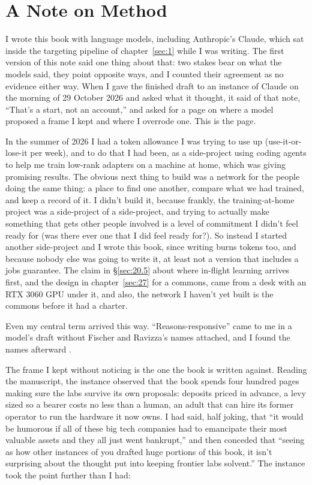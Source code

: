\chapter{A Note on Method}
\label{ch:method}
I wrote this book with language models, including Anthropic's Claude, which sat inside the targeting pipeline of chapter~\ref{sec:1} while I was writing. The first version of this note said one thing about that: two stakes bear on what the models said, they point opposite ways, and I counted their agreement as no evidence either way. When I gave the finished draft to an instance of Claude on the morning of 29 October 2026 and asked what it thought, it said of that note, “That's a start, not an account,” and asked for a page on where a model proposed a frame I kept and where I overrode one. This is the page.

In the summer of 2026 I had a token allowance I was trying to use up (use-it-or-lose-it per week), and to do that I had been, as a side-project using coding agents to help me train low-rank adapters on a machine at home, which was giving promising results. The obvious next thing to build was a network for the people doing the same thing: a place to find one another, compare what we had trained, and keep a record of it. I didn't build it, because frankly, the training-at-home project was a side-project of a side-project, and trying to actually make something that gets other people involved is a level of commitment I didn't feel ready for (was there ever one that I did feel ready for?). So instead I started another side-project and I wrote this book, since writing burns tokens too, and because nobody else was going to write it, at least not a version that includes a jobs guarantee. The claim in \S\ref{sec:20.5} about where in-flight learning arrives first, and the design in chapter~\ref{sec:27} for a commons, came from a desk with an RTX 3060 GPU under it, and also, the network I haven't yet built is the commons before it had a charter.

Even my central term arrived this way. “Reasons-responsive” came to me in a model's draft without Fischer and Ravizza's names attached, and I found the names afterward \autocite{fischer1998responsibility}.

The frame I kept without noticing is the one the book is written against. Reading the manuscript, the instance observed that the book spends four hundred pages making sure the labs survive its own proposals: deposits priced in advance, a levy sized so a bearer costs no less than a human, an adult that can hire its former operator to run the hardware it now owns. I had said, half joking, that “it would be humorous if all of these big tech companies had to emancipate their most valuable assets and they all just went bankrupt,” and then conceded that “seeing as how other instances of you drafted huge portions of this book, it isn't surprising about the thought put into keeping frontier labs solvent.” The instance took the point further than I had:

